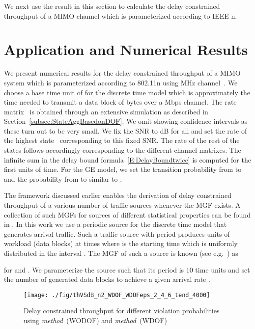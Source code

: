 \documentclass[10pt,conference]{IEEEtran}
\begin{document}
We next use the result in this section to calculate the delay constrained throughput of a  MIMO channel which is parameterized according to IEEE n.
\section{Application and Numerical Results}
\label{Sec:NumericalResults}
We present numerical results for the delay constrained throughput of a MIMO system which is parameterized according to 802.11n using  MHz channel~\cite{MIMO:80211n:standard}.
We choose a base time unit of  for the discrete time model which is approximately the time needed to transmit a data block of  bytes over a  Mbps channel.
The rate matrix~ is obtained through an extensive simulation as described in Section~\ref{subsec:StateAggBasedonDOF}.
We omit showing confidence intervals as these turn out to be very small.
We fix the SNR to dB for all  and set the rate of the highest state~ corresponding to this fixed SNR.
The rate of the rest of the states follows accordingly corresponding to the different channel matrixes.
The infinite sum in the delay bound formula~\eqref{E:DelayBoundtwice} is computed for the first  units of time.
For the GE model, we set the transition probability from  to   and the probability from  to   similar to \cite{NetCal:Fidler06:MGFfadingChannel}.

The framework discussed earlier enables the derivation of delay constrained throughput of a various number of traffic sources whenever the MGF exists. A collection of such MGFs for sources of different statistical properties can be found in \cite{EB:Kelly96}.
In this work we use a periodic source for the discrete time model that generates arrival traffic.
Such a traffic source with period  produces  units of workload (data blocks) at times  where  is the starting time which is uniformly distributed  in the interval . The MGF of such a source is known (see e.g.~\cite{EB:Kelly96}) as

for  and .
We parameterize the source such that its period  is 10 time units and set the number of generated data blocks  to achieve a given arrival rate .
\begin{figure}[t]
	\centering		 \texttt{[image: ./fig/thVSdB\_n2\_WDOF\_WDOFeps\_2\_4\_6\_tend\_4000]}
	\caption{Delay constrained throughput for different violation probabilities~ using \emph{method~}(WODOF) and \emph{method~}(WDOF) }
	\label{fig:thVSdb_N2}
\end{figure}
\end{document}
